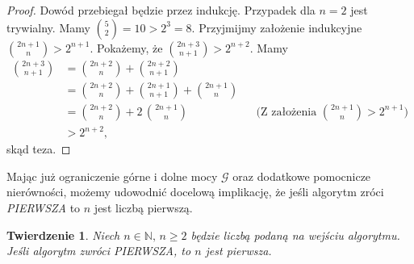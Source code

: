 \documentclass[declaration,shortabstract]{iithesis}
\theoremstyle{definition}
\theoremstyle{remark} \newtheorem{observation}{Obserwacja}
\theoremstyle{plain} \newtheorem{theorem}{Twierdzenie}
\theoremstyle{plain} \newtheorem{lemma}{Lemat}
\theoremstyle{remark} \newtheorem*{remark*}{Uwaga}
\theoremstyle{reminder} \newtheorem*{reminder*}{Przypomnienie}
\begin{document}
\begin{proof}
	Dowód przebiegał będzie przez indukcję. Przypadek dla $n = 2$ jest trywialny. Mamy ${5 \choose 2} = 10 > 2^3 = 8.$\newline
	Przyjmijmy założenie indukcyjne ${2n + 1 \choose n} > 2^{n+1}$. Pokażemy, że ${2n + 3 \choose n + 1} > 2^{n+2}$. Mamy
	\begin{align*}
		{2n + 3 \choose n + 1} &= {2n + 2 \choose n} + {2n + 2 \choose n + 1} \\
		&= {2n + 2 \choose n} + {2n + 1 \choose n + 1} + {2n + 1 \choose n} \\
		  & = {2n + 2 \choose n} + 2\, {2n + 1 \choose n} &   & \text{(Z założenia ${2n + 1 \choose n} > 2^{n+1}$)} \\
		&> 2^{n+2},
	\end{align*}
	skąd teza.
\end{proof}

Mając już ograniczenie górne i dolne mocy $\mathcal{G}$ oraz dodatkowe pomocnicze nierówności, możemy udowodnić docelową implikację, że jeśli algorytm zróci \textit{PIERWSZA} to $n$ jest liczbą pierwszą.
	
\begin{theorem}\label{T1}
	Niech $n \in \mathbb{N}, \, n \geq 2$ będzie liczbą podaną na wejściu algorytmu. Jeśli algorytm zwróci \textit{PIERWSZA}, to $n$ jest pierwsza.
\end{theorem}
	
\end{document}
